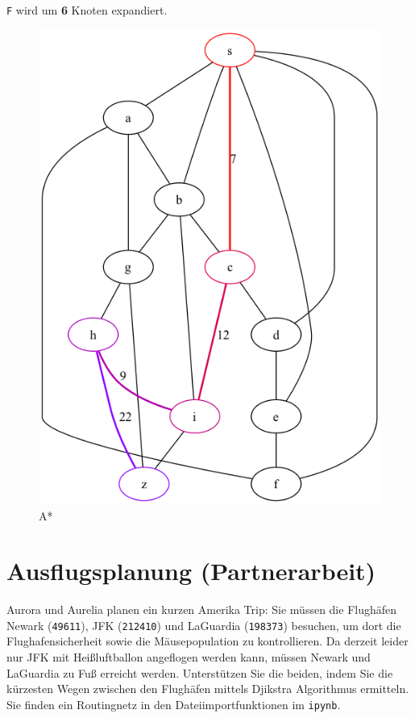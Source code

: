 \documentclass[a4paper,11pt]{report}
\begin{document}
\texttt{F} wird um \textbf{6} Knoten expandiert.

\begin{figure}[htbp]
    \centering
    \includegraphics[height=0.2\textheight]{notebooks/assets/aufgabe_05/astar}
    \caption{A*}
    \label{fig:astar_graph}
\end{figure}

\newpage

\chapter{Ausflugsplanung (Partnerarbeit)}

Aurora und Aurelia planen ein kurzen Amerika Trip:
Sie müssen die Flughäfen Newark (\texttt{49611}), JFK (\texttt{212410}) und LaGuardia (\texttt{198373}) besuchen, um dort die Flughafensicherheit sowie die Mäusepopulation zu kontrollieren.
Da derzeit leider nur JFK mit Heißluftballon angeflogen werden kann, müssen Newark und LaGuardia zu Fuß erreicht werden.
Unterstützen Sie die beiden, indem Sie die kürzesten Wegen zwischen den Flughäfen mittels Djikstra Algorithmus ermitteln.
Sie finden ein Routingnetz in den Dateiimportfunktionen im \texttt{ipynb}.
\end{document}
